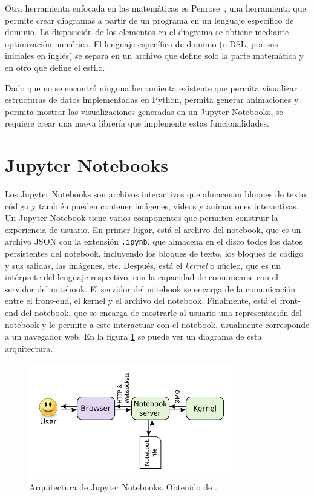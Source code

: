 Otra herramienta enfocada en las matemáticas es Penrose~\cite{Penrose}, una herramienta que permite crear diagramas a partir de un programa en un lenguaje específico de dominio. La disposición de los elementos en el diagrama se obtiene mediante optimización numérica. El lenguaje específico de dominio (o DSL, por sus iniciales en inglés) se separa en un archivo que define solo la parte matemática y en otro que define el estilo.



Dado que no se encontró ninguna herramienta existente que permita visualizar estructuras de datos implementadas en Python, permita generar animaciones y permita mostrar las visualizaciones generadas en un Jupyter Notebooks, se requiere crear una nueva librería que implemente estas funcionalidades.

\section{Jupyter Notebooks}

Los Jupyter Notebooks son archivos interactivos que almacenan bloques de texto, código y también pueden contener imágenes, videos y animaciones interactivas. Un Jupyter Notebook tiene varios componentes que permiten construir la experiencia de usuario. En primer lugar, está el archivo del notebook, que es un archivo JSON con la extensión \texttt{.ipynb}, que almacena en el disco todos los datos persistentes del notebook, incluyendo los bloques de texto, los bloques de código y sus salidas, las imágenes, etc. Después, está el \textit{kernel} o núcleo, que es un intérprete del lenguaje respectivo, con la capacidad de comunicarse con el servidor del notebook. El servidor del notebook se encarga de la comunicación entre el front-end, el kernel y el archivo del notebook. Finalmente, está el front-end del notebook, que se encarga de mostrarle al usuario una representación del notebook y le permite a este interactuar con el notebook, usualmente corresponde a un navegador web. En la figura \ref{fig:notebook_arq} se puede ver un diagrama de esta arquitectura.

\begin{figure}[h]
  \centering
  \includegraphics[width=0.8\textwidth]{imagenes/notebook/notebook_components}
  \caption[Arquitectura de Jupyter Notebooks]{Arquitectura de Jupyter Notebooks. Obtenido de \cite{arq-notebook}.}
  \label{fig:notebook_arq}
\end{figure}

